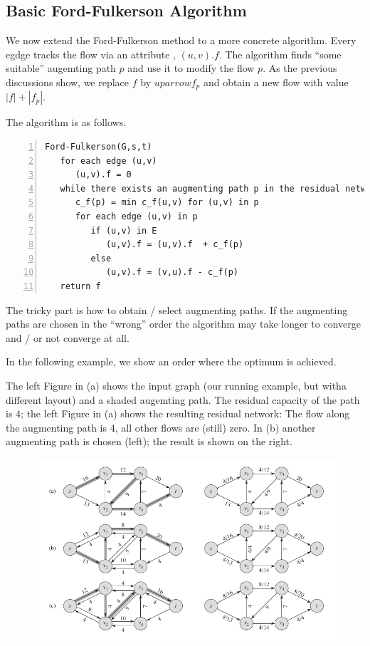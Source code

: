 \subsection{Basic Ford-Fulkerson Algorithm}

We now extend the Ford-Fulkerson method to a more concrete algorithm. Every egdge tracks the flow via an attribute , $(u,v).f$. The algorithm finds ``some suitable'' augemting path $p$ and use it to modify the flow $p$. As the previous discussions show, we replace $f$ by $uparrow f_p$ and obtain a new flow with value $|f| + |f_p|$.  

The algorithm is as follows.

\begin{Verbatim}[numbers=left, xleftmargin=5mm]
Ford-Fulkerson(G,s,t)
   for each edge (u,v)
      (u,v).f = 0
   while there exists an augmenting path p in the residual network G_f
      c_f(p) = min c_f(u,v) for (u,v) in p
      for each edge (u,v) in p
         if (u,v) in E
            (u,v).f = (u,v).f  + c_f(p)
         else
            (u,v).f = (v,u).f - c_f(p)   
   return f
\end{Verbatim}

The tricky part is how to obtain / select augmenting paths. If the augmenting paths are chosen in the ``wrong'' order the algorithm may take longer to converge and / or not converge at all.

In the following example, we show an order where the optimum is achieved.

The left Figure in (a) shows the input graph (our running example, but witha different layout) and a shaded augemting path. The residual capacity of the path is $4$; the left Figure in (a) shows the resulting residual network: The flow along the augmenting path is $4$, all other flows are (still) zero. In (b) another augmenting path is chosen (left); the result is shown on the right.

\begin{figure}[H] \centering
\includegraphics[scale=0.5]{images/max_flow_ex_1.png}
\end{figure}

